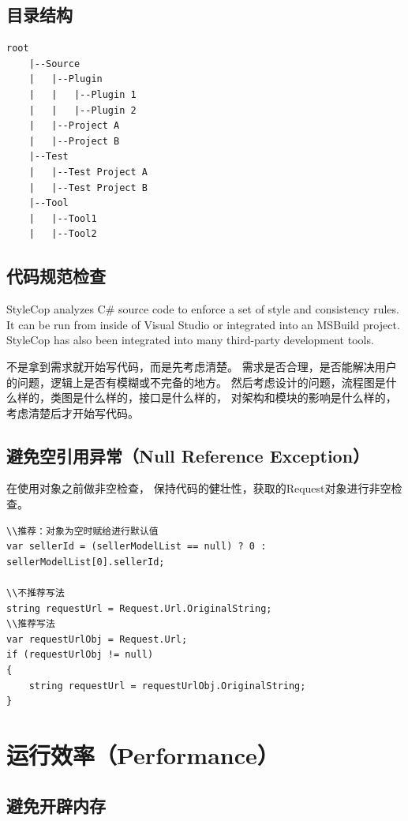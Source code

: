 \documentclass{book}
\begin{document}
\subsection{目录结构}

\begin{lstlisting}
root
	|--Source
	|	|--Plugin
	|	|	|--Plugin 1
	|	|	|--Plugin 2
	|	|--Project A
	|	|--Project B
	|--Test
	|	|--Test Project A
	|	|--Test Project B
	|--Tool
	|	|--Tool1
	|	|--Tool2	
\end{lstlisting}


\subsection{代码规范检查}

StyleCop analyzes C\# source code to enforce a set of style and consistency rules. It can be run from inside of Visual Studio or integrated into an MSBuild project. StyleCop has also been integrated into many third-party development tools.

不是拿到需求就开始写代码，而是先考虑清楚。 
需求是否合理，是否能解决用户的问题，逻辑上是否有模糊或不完备的地方。 
然后考虑设计的问题，流程图是什么样的，类图是什么样的，接口是什么样的，
对架构和模块的影响是什么样的，考虑清楚后才开始写代码。

\subsection{避免空引用异常（Null Reference Exception）}

在使用对象之前做非空检查，
保持代码的健壮性，获取的Request对象进行非空检查。

\begin{lstlisting}[language={[Sharp]C}]
\\推荐：对象为空时赋给进行默认值
var sellerId = (sellerModelList == null) ? 0 : sellerModelList[0].sellerId;

\\不推荐写法
string requestUrl = Request.Url.OriginalString;
\\推荐写法
var requestUrlObj = Request.Url;
if (requestUrlObj != null)
{
    string requestUrl = requestUrlObj.OriginalString;
}
\end{lstlisting}

\section{运行效率（Performance）}

\subsection{避免开辟内存}
\end{document}
